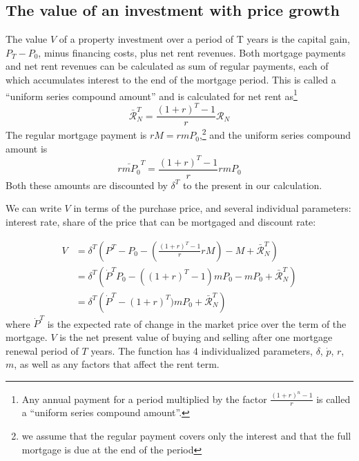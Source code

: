 {\color{black}
 \subsection{The value of an investment with price growth}
The value $V$ of a property investment over a period of T years is  the capital gain, $P_{T}-P_{0}$, minus financing costs, plus net rent revenues. Both mortgage payments and net rent revenues can  be calculated as sum  of regular payments, each of  which accumulates interest to the end of the mortgage period. This is called a ``uniform series compound amount'' and is calculated for net rent as\footnote{Any annual payment for a period multiplied by the factor $\frac{(1+r)^n-1}{r}$ is called a  ``uniform series compound amount''.%
} 
\[\mathcal{\bar{R}}^T_N= \frac{(1+r)^T-1}{r}\mathcal{R}_N  \]
The regular mortgage payment is  $rM=rmP_0$,\footnote{we assume that the regular payment covers only the interest and that the full mortgage is due at the end of the period } and the uniform series compound amount is
\[\bar{rmP_0}^T= \frac{(1+r)^T-1}{r}rmP_0  \]
Both these amounts are discounted by $\delta^T$ to the present in our calculation.
 
 
 We can write $V$ in terms of the purchase price, and several individual parameters: interest  rate, share of the price that can be mortgaged and  discount rate:%
 
 \begin{align}
V &= \delta^T\left( P^T-P_0- \left(\frac{(1+r)^T-1}{r}rM\right)- M+ \mathcal{\bar{R}}^T_N \right)      \\
&= \delta^T \left(
\dot P^T P_0 -\left((1+r)^T-1\right)mP_0-mP_0
 +  \mathcal{\bar{R}}^T_N \right) 
\label{first_sub}\\
  &= \delta^T \left(\dot P^T - (1+r)^T)m P_0 + \mathcal{\bar{R}}^T_N\right)
\end{align}
where $\dot P^T$  is the expected rate of change in the market price over the term of the mortgage.
$V$ is the net present value of buying and selling after one mortgage renewal period of $T$ years. %
The function has 4 individualized  parameters, $\delta$, $\dot p$, $r$, $m$, as well as any factors that affect the rent term.

}
